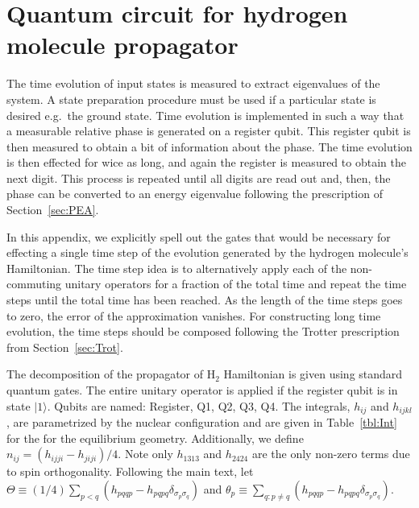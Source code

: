\documentclass[11pt,oneside,final]{huthesis}%
\begin{document}
\chapter{Quantum circuit for hydrogen molecule propagator }\label{appx:code}

The time evolution of input states is measured to extract eigenvalues of the system.  A state preparation procedure must be used if a particular state is desired e.g.~the ground state.  Time evolution is implemented in such a way that a measurable relative phase is generated on a register qubit.  This register qubit is then measured to obtain a bit of information about the phase.  The time evolution is then effected for wice as long, and again the register is measured to obtain the next digit.  This process is repeated until all digits are read out and, then, the phase can be converted to an energy eigenvalue following the prescription of Section~\ref{sec:PEA}.  

In this appendix, we explicitly spell out the gates that would be necessary for effecting a single time step of the evolution generated by the hydrogen molecule's Hamiltonian.   The time step idea is to alternatively apply each of the non-commuting unitary operators for a fraction of the total time and repeat the time steps until the total time has been reached.  As the length of the time steps goes to zero, the error of the approximation vanishes.  For constructing long time evolution, the time steps should be composed following the Trotter prescription from Section~\ref{sec:Trot}.

The decomposition of the propagator of H$_2$ Hamiltonian is 
given using standard quantum gates. The entire unitary 
operator is applied if the register qubit is in state $|1\rangle$.
Qubits are named: Register, Q1, Q2, Q3, Q4.
The integrals, $h_{ij}$ and $h_{ijkl}$, are parametrized by the nuclear configuration and  are given in Table~\ref{tbl:Int} for the for the equilibrium geometry.
Additionally, we define $n_{ij}=(h_{ijji}-h_{jiji})/4$.  Note only $h_{1313}$ and $h_{2424}$ are the only non-zero terms due to spin orthogonality.
Following the main text, let $\Theta\equiv(1/4)\sum_{p<q}(h_{pqqp}-h_{pqpq}\delta_{\sigma_p\sigma_q})$ and $\theta_p\equiv \sum_{q:p\neq q}(h_{pqqp}-h_{pqpq}\delta_{\sigma_p\sigma_q}).$  
\end{document}
